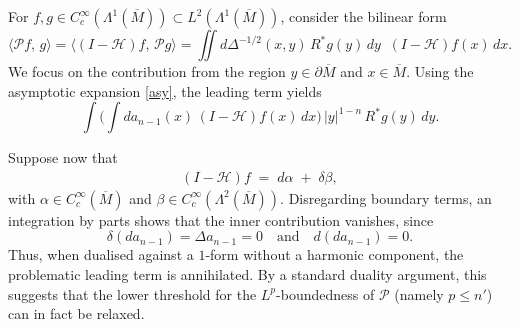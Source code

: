 \documentclass[12pt]{amsart}
\begin{document}
For $f,g \in C_c^\infty(\Lambda^1(\overline M)) \subset L^2(\Lambda^1(\overline M))$, consider the bilinear form
\[
\langle \mathcal{P}f,\,g\rangle 
= \langle (I-\mathcal{H})f,\, \mathcal{P}g\rangle
= \iint d\Delta^{-1/2}(x,y)\, R^* g(y)\,dy \;\; (I-\mathcal{H})f(x)\,dx.
\]
We focus on the contribution from the region $y \in \partial \overline{M}$ and $x \in \overline{M}$. Using the asymptotic expansion \eqref{asy}, the leading term yields
\[
\int \Bigg(\int d a_{n-1}(x)\,(I-\mathcal{H})f(x)\,dx\Bigg)\,|y|^{1-n}\,R^* g(y)\,dy.
\]





Suppose now that
\begin{align}\label{decom}
    (I-\mathcal{H})f \;=\; d\alpha \;+\; \delta\beta,
\end{align}
with $\alpha \in C_c^\infty(\overline M)$ and $\beta \in C_c^\infty(\Lambda^2(\overline M))$.  
Disregarding boundary terms, an integration by parts shows that the inner contribution vanishes, since 
\[
\delta(d a_{n-1}) = \Delta a_{n-1} = 0 
\quad\text{and}\quad 
d(d a_{n-1}) = 0.
\] 
Thus, when dualised against a $1$-form without a harmonic component, the problematic leading term is annihilated. By a standard duality argument, this suggests that the lower threshold for the $L^p$-boundedness of $\mathcal{P}$ (namely $p\le n'$) can in fact be relaxed.  
\end{document}
